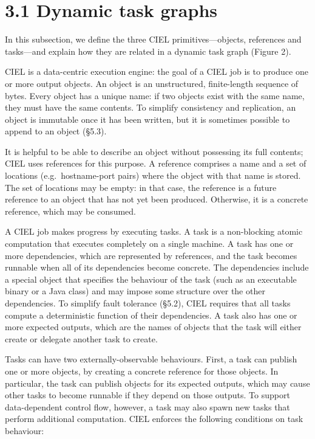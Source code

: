 \documentclass[
]{article}
\begin{document}
\section{3.1 Dynamic task graphs}\label{dynamic-task-graphs}

In this subsection, we define the three CIEL primitives---objects,
references and tasks---and explain how they are related in a dynamic
task graph (Figure 2).

CIEL is a data-centric execution engine: the goal of a CIEL job is to
produce one or more output objects. An object is an unstructured,
finite-length sequence of bytes. Every object has a unique name: if two
objects exist with the same name, they must have the same contents. To
simplify consistency and replication, an object is immutable once it has
been written, but it is sometimes possible to append to an object
(§5.3).

It is helpful to be able to describe an object without possessing its
full contents; CIEL uses references for this purpose. A reference
comprises a name and a set of locations (e.g.~hostname-port pairs) where
the object with that name is stored. The set of locations may be empty:
in that case, the reference is a future reference to an object that has
not yet been produced. Otherwise, it is a concrete reference, which may
be consumed.

A CIEL job makes progress by executing tasks. A task is a non-blocking
atomic computation that executes completely on a single machine. A task
has one or more dependencies, which are represented by references, and
the task becomes runnable when all of its dependencies become concrete.
The dependencies include a special object that specifies the behaviour
of the task (such as an executable binary or a Java class) and may
impose some structure over the other dependencies. To simplify fault
tolerance (§5.2), CIEL requires that all tasks compute a deterministic
function of their dependencies. A task also has one or more expected
outputs, which are the names of objects that the task will either create
or delegate another task to create.

Tasks can have two externally-observable behaviours. First, a task can
publish one or more objects, by creating a concrete reference for those
objects. In particular, the task can publish objects for its expected
outputs, which may cause other tasks to become runnable if they depend
on those outputs. To support data-dependent control flow, however, a
task may also spawn new tasks that perform additional computation. CIEL
enforces the following conditions on task behaviour:
\end{document}
